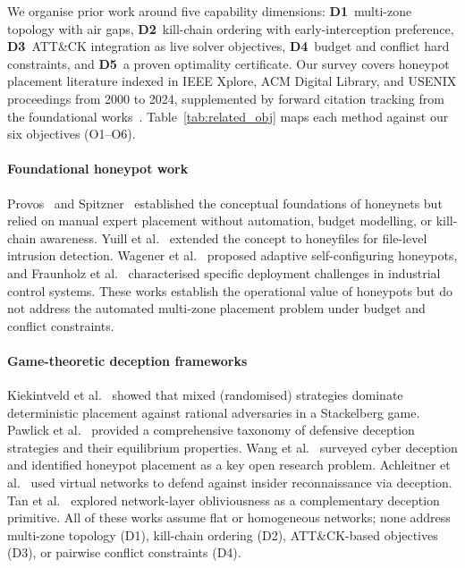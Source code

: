 \documentclass[journal]{IEEEtran}
\begin{document}
We organise prior work around five capability dimensions:
\textbf{D1}~multi-zone topology with air gaps, \textbf{D2}~kill-chain
ordering with early-interception preference, \textbf{D3}~ATT\&CK
integration as live solver objectives, \textbf{D4}~budget and
conflict hard constraints, and \textbf{D5}~a proven optimality
certificate. Our survey covers honeypot placement literature indexed
in IEEE Xplore, ACM Digital Library, and USENIX proceedings from
2000 to 2024, supplemented by forward citation tracking from the
foundational works~\cite{provos2004,spitzner2003,kiekintveld2015}.
Table~\ref{tab:related_obj} maps each method against our six
objectives (O1--O6).

\paragraph{Foundational honeypot work}
Provos~\cite{provos2004} and Spitzner~\cite{spitzner2003} established
the conceptual foundations of honeynets but relied on manual expert
placement without automation, budget modelling, or kill-chain
awareness. Yuill et al.~\cite{yuill2004} extended the concept to
honeyfiles for file-level intrusion detection. Wagener et
al.~\cite{wagener2009} proposed adaptive self-configuring honeypots,
and Fraunholz et al.~\cite{fraunholz2017} characterised specific
deployment challenges in industrial control systems. These works
establish the operational value of honeypots but do not address the
automated multi-zone placement problem under budget and conflict
constraints.

\paragraph{Game-theoretic deception frameworks}
Kiekintveld et al.~\cite{kiekintveld2015} showed that mixed (randomised)
strategies dominate deterministic placement against rational adversaries
in a Stackelberg game. Pawlick et al.~\cite{pawlick2019} provided a
comprehensive taxonomy of defensive deception strategies and their
equilibrium properties. Wang et al.~\cite{wang2018} surveyed cyber
deception and identified honeypot placement as a key open research
problem. Achleitner et al.~\cite{achleitner2017} used virtual networks
to defend against insider reconnaissance via deception. Tan et
al.~\cite{tan2011} explored network-layer obliviousness as a
complementary deception primitive. All of these works assume flat or
homogeneous networks; none address multi-zone topology (D1),
kill-chain ordering (D2), ATT\&CK-based objectives (D3), or
pairwise conflict constraints (D4).
\end{document}
